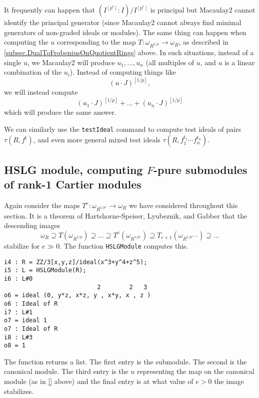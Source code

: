 \documentclass[11pt]{amsart}
\begin{document}
\begin{remark}
It frequently can happen that $(I^{[p^e]} : I)/I^{[p^e]}$ is principal but Macaulay2 cannot identify the principal generator (since Macaulay2 cannot always find minimal generators of non-graded ideals or modules).  The same thing can happen when computing the $u$ corresponding to the map $T : \omega_{R^{1/p}} \to \omega_R$, as described in \autoref{subsec.DualToFrobeniusOnQuotientRings} above.  In such situations, instead of a single $u$, we Macaulay2 will produce $u_1, \dots, u_n$ (all multiples of $u$, and $u$ is a linear combination of the $u_i$).  Instead of computing things like
\[
(u \cdot J)^{[1/p]},
\]
we will instead compute
\[
(u_1 \cdot J)^{[1/p]} + \dots + (u_n \cdot J)^{[1/p]}
\]
which will produce the same answer.
\end{remark}

We can similarly use the \texttt{testIdeal} command to compute test ideals of pairs $\tau(R, f^t)$, and even more general mixed test ideals $\tau(R, f_1^{t_1} \cdots f_n^{t_n})$.

\subsection{HSLG module, computing $F$-pure submodules of rank-1 Cartier modules}

Again consider the maps $T^e : \omega_{R^{1/p^e}} \to \omega_R$ we have considered throughout this section.  It is a theorem of Hartshorne-Speiser, Lyubeznik, and Gabber \cite{HartshorneSpeiserLocalCohomologyInCharacteristicP,LyubeznikFModulesApplicationsToLocalCohomology,Gabber.tStruc} that the descending images
\[
\omega_R \supseteq T(\omega_{R^{1/p}}) \supseteq \dots \supseteq T^e(\omega_{R^{1/p^e}}) \supseteq T_{e+1}(\omega_{R^{1/p^{e+1}}}) \supseteq \dots
\]
stabilize for $e \gg 0$.  The function \texttt{HSLGModule} computes this.
\begin{verbatim}
i4 : R = ZZ/3[x,y,z]/ideal(x^3+y^4+z^5);
i5 : L = HSLGModule(R);
i6 : L#0
                          2        2   3
o6 = ideal (0, y*z, x*z, y , x*y, x , z )
o6 : Ideal of R
i7 : L#1
o7 = ideal 1
o7 : Ideal of R
i8 : L#3
o8 = 1
\end{verbatim}
The function returns a list.  The first entry is the submodule.  The second is the canonical module.  The third entry is the $u$ representing the map on the canonical module (as in \autoref{} above)
and the final entry is at what value of $e > 0$ the image stabilizes.
\end{document}
